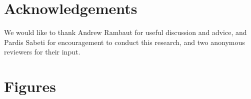 \documentclass{bmcart}
\begin{document}
\begin{backmatter}
\section*{Acknowledgements}
We would like to thank Andrew Rambaut for useful discussion and advice, and Pardis Sabeti for encouragement to conduct this research, and two anonymous reviewers for their input. \\





\section*{Figures}


\end{backmatter}
\end{document}
